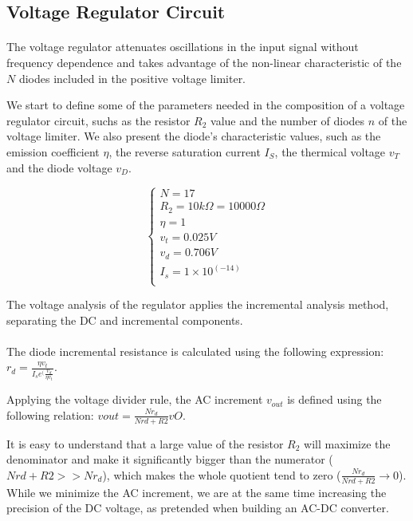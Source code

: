 \subsection{Voltage Regulator Circuit}
\label{subsec:regulator}

\paragraph{}
The voltage regulator attenuates oscillations in the input signal without frequency dependence and takes advantage of the non-linear characteristic of the $N$ diodes included in the positive voltage limiter. 

We start to define some of the parameters needed in the composition of a voltage regulator circuit, suchs as the resistor $R_2$ value and the number of diodes $n$ of the voltage limiter. We also present the diode's characteristic values, such as the emission coefficient $\eta$, the reverse saturation current $I_S$, the thermical voltage $v_T$ and the diode voltage $v_D$.

\[
\left\{\begin{matrix}
N=17\\
R_2=10k\Omega=10 000\Omega\\
\eta=1\\
v_t=0.025 V\\
v_d=0.706 V\\
I_s=1\times10^(-14)\\
\end{matrix}\right.
\]


The voltage analysis of the regulator applies the incremental analysis method, separating the DC and incremental components.

\paragraph{}
The diode incremental resistance is calculated using the following expression: $r_d=\frac{\eta v_t}{I_s e^(\frac{v_d}{\eta v_t}}$.

Applying the voltage divider rule, the AC increment $v_{out}$ is defined using the following relation: $vout=\frac{N r_d}{N rd+R2}vO$.

It is easy to understand that a large value of the resistor $R_2$ will maximize the denominator and make it significantly bigger than the numerator ($N rd+R2 >> N r_d$), which makes the whole quotient tend to zero ($\frac{N r_d}{N rd+R2} \longrightarrow 0$). While we minimize the AC increment, we are at the same time increasing the precision of the DC voltage, as pretended when building an AC-DC converter.

